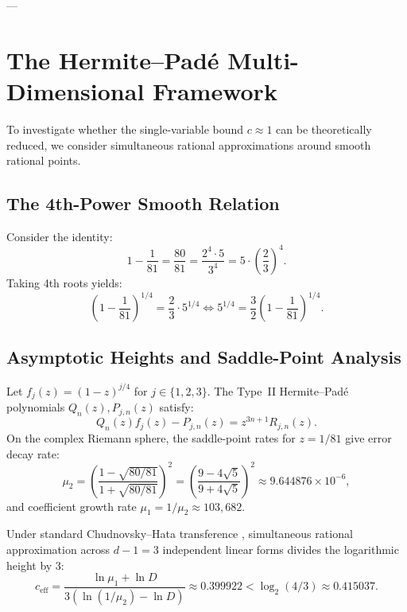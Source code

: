 \documentclass[11pt,reqno]{article}
\theoremstyle{plain}
\theoremstyle{definition}
\numberwithin{equation}{section}
\begin{document}
---

\section{The Hermite--Pad\'e Multi-Dimensional Framework}

To investigate whether the single-variable bound $c \approx 1$ can be theoretically reduced, we consider simultaneous rational approximations around smooth rational points.

\subsection{The 4th-Power Smooth Relation}
Consider the identity:
\begin{equation}\label{eq:base_identity}
1 - \frac{1}{81} = \frac{80}{81} = \frac{2^4 \cdot 5}{3^4} = 5 \cdot \left(\frac{2}{3}\right)^4.
\end{equation}
Taking 4th roots yields:
\begin{equation}
\left(1 - \frac{1}{81}\right)^{1/4} = \frac{2}{3} \cdot 5^{1/4} \iff 5^{1/4} = \frac{3}{2} \left(1 - \frac{1}{81}\right)^{1/4}.
\end{equation}

\subsection{Asymptotic Heights and Saddle-Point Analysis}
Let $f_j(z) = (1 - z)^{j/4}$ for $j \in \{1, 2, 3\}$. The Type~II Hermite--Pad\'e polynomials $Q_n(z), P_{j,n}(z)$ satisfy:
\begin{equation}
Q_n(z) f_j(z) - P_{j,n}(z) = z^{3n+1} R_{j,n}(z).
\end{equation}
On the complex Riemann sphere, the saddle-point rates for $z = 1/81$ give error decay rate:
\begin{equation}
\mu_2 = \left(\frac{1 - \sqrt{80/81}}{1 + \sqrt{80/81}}\right)^2 = \left(\frac{9 - 4\sqrt{5}}{9 + 4\sqrt{5}}\right)^2 \approx 9.644876 \times 10^{-6},
\end{equation}
and coefficient growth rate $\mu_1 = 1/\mu_2 \approx 103{,}682$.

Under standard Chudnovsky--Hata transference \cite{chudnovsky1981, hata1993}, simultaneous rational approximation across $d-1 = 3$ independent linear forms divides the logarithmic height by 3:
\begin{equation}
c_{\mathrm{eff}} = \frac{\ln \mu_1 + \ln D}{3\left(\ln(1/\mu_2) - \ln D\right)} \approx 0.399922 < \log_2(4/3) \approx 0.415037.
\end{equation}
\end{document}
